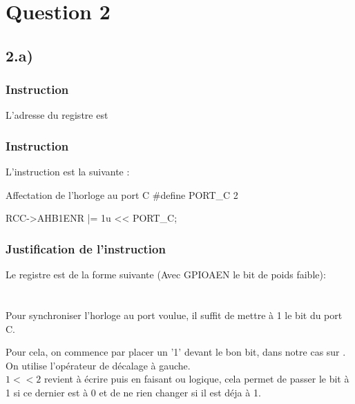 {

\section{Question 2}

\subsection{2.a)}
\subsubsection*{Instruction}
L'adresse du registre  est 

\subsubsection{Instruction}
L'instruction est la suivante : 

\begin{Cpp}{Affectation de l'horloge au port C}
#define PORT_C 2

RCC->AHB1ENR |= 1u << PORT_C;	
\end{Cpp}
\subsubsection{Justification de l'instruction}

Le registre  est de la forme suivante (Avec GPIOAEN le bit de poids faible): \\
     \\
    \quad\quad \quad\quad {}   \quad\quad \quad\quad          {}    \quad\quad \quad\quad  {}    \quad\quad \quad\quad{}\\



Pour synchroniser l'horloge au port voulue, il suffit de mettre à 1 le bit du port C.

Pour cela, on commence par placer un '1' devant le bon bit, dans notre cas sur . On utilise l'opérateur de décalage à gauche.\\



$1 << 2$ revient à écrire  puis en faisant ou  logique, cela permet de passer le bit à 1 si ce dernier est à 0 et de ne rien changer si il est déja à 1.


}
